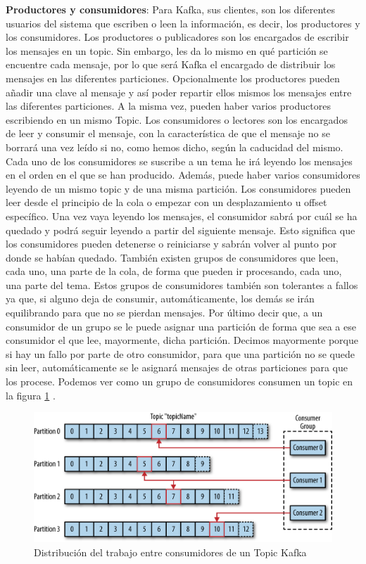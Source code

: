 \textbf{Productores y consumidores}: Para Kafka, sus clientes, son los diferentes usuarios del sistema que escriben o leen la información, es decir, los productores y los consumidores. Los productores o publicadores son los encargados de escribir los mensajes en un topic. Sin embargo, les da lo mismo en qué partición se encuentre cada mensaje, por lo que será Kafka el encargado de distribuir los mensajes en las diferentes particiones. Opcionalmente los productores pueden añadir una clave al mensaje y así poder repartir ellos mismos los mensajes entre las diferentes particiones. A la misma vez, pueden haber varios productores escribiendo en un mismo Topic. Los consumidores o lectores son los encargados de leer y consumir el mensaje, con la característica de que el mensaje no se borrará una vez leído si no, como hemos dicho, según la caducidad del mismo. Cada uno de los consumidores se suscribe a un tema he irá leyendo los mensajes en el orden en el que se han producido. Además, puede haber varios consumidores leyendo de un mismo topic y de una misma partición. Los consumidores pueden leer desde el principio de la cola o empezar con un desplazamiento u offset específico. Una vez vaya leyendo los mensajes, el consumidor sabrá por cuál se ha quedado y podrá seguir leyendo a partir del siguiente mensaje. Esto significa que los consumidores pueden detenerse o reiniciarse y sabrán volver al punto por donde se habían quedado. También existen grupos de consumidores que leen, cada uno, una parte de la cola, de forma que pueden ir procesando, cada uno, una parte del tema. Estos grupos de consumidores también son tolerantes a fallos ya que, si alguno deja de consumir, automáticamente, los demás se irán equilibrando para que no se pierdan mensajes. Por último decir que, a un consumidor de un grupo se le puede asignar una partición de forma que sea a ese consumidor el que lee, mayormente, dicha partición. Decimos mayormente porque si hay un fallo por parte de otro consumidor, para que una partición no se quede sin leer, automáticamente se le asignará mensajes de otras particiones para que los procese. Podemos ver como un grupo de consumidores consumen un topic en la figura \ref{Kfk-img-2} \cite{Kfk-1}.

\begin{figure}[htp]
\centering
\includegraphics[scale=0.30]{Imagenes/kafka2.png}
\caption{Distribución del trabajo entre consumidores de un Topic Kafka}
\label{Kfk-img-2}
\end{figure}

